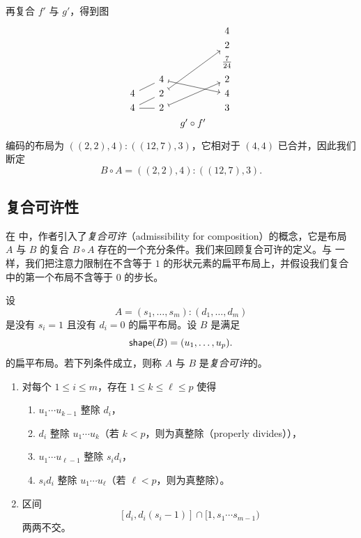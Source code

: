再复合 $f'$ 与 $g'$，得到图
\[ \begin{tikzcd} [row sep = 1, column sep = 8]
 & & & & 4 \\
 & & & & 2 \\
 & & & & \frac{7}{24} \\
 & & 4 \ar[drr,mapsto] & & 2 \\
4 \ar[urr,-] & & 2 \ar[uuurr,mapsto] & & 4\\
4 \ar[rr,-] \ar[urr,-] & & 2 \ar[uurr,mapsto] & & 3\\
 & & & g' \circ f' & \\
\end{tikzcd} \]
编码的布局为 $((2,2),4):((12,7),3)$，它相对于 $(4,4)$ 已合并，因此我们断定
\[
B \circ A = ((2,2),4):((12,7),3).
\]

\subsection{复合可许性}

在 \cite{shah2024layout} 中，作者引入了{\it 复合可许}（admissibility for composition）的概念，它是布局 $A$ 与 $B$ 的复合 $B \circ A$ 存在的一个充分条件。我们来回顾复合可许的定义。与 \cite{shah2024layout} 一样，我们把注意力限制在不含等于 $1$ 的形状元素的扁平布局上，并假设我们复合中的第一个布局不含等于 $0$ 的步长。

\begin{definition}\label{admissibilityforcomposition}
    设
    \[
    A = (s_1,\dots,s_m):(d_1,\dots,d_m)
    \]
    是没有 $s_i = 1$ 且没有 $d_i = 0$ 的扁平布局。设 $B$ 是满足
    \[
    \mathsf{shape}(B) = (u_1,\dots,u_p).
    \]
    的扁平布局。若下列条件成立，则称 $A$ 与 $B$ 是{\it 复合可许}的。
    \begin{enumerate}
        \item 对每个 $ 1 \leq i \leq m$，存在 $1 \leq k \leq \ell \leq p$ 使得
        \begin{enumerate}
            \item $u_1 \cdots u_{k-1}$ 整除 $d_i$，
            \item $d_i$ 整除 $u_1 \cdots u_k$（若 $k < p$，则为真整除（properly divides）），
            \item $u_1 \cdots u_{\ell-1}$ 整除 $s_id_i$，
            \item $s_i d_i$ 整除 $u_1 \cdots u_\ell$（若 $\ell < p$，则为真整除）。
        \end{enumerate}
        \item 区间
        \[
        [d_i, d_i(s_i-1)] \cap [1,s_1 \cdots s_{m-1})
        \]
        两两不交。
    \end{enumerate}
\end{definition}

